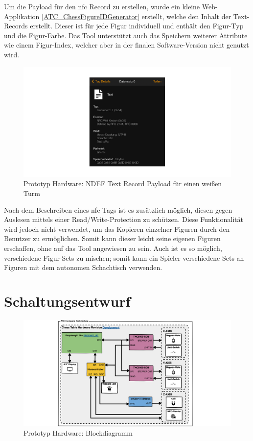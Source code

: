 Um die Payload für den \gls{nfc} Record zu erstellen, wurde ein kleine
Web-Applikation \ref{ATC_ChessFigureIDGenerator} erstellt, welche den
Inhalt der Text-Records erstellt. Dieser ist für jede Figur individuell
und enthält den Figur-Typ und die Figur-Farbe. Das Tool unterstützt auch
das Speichern weiterer Attribute wie einem Figur-Index, welcher aber in
der finalen Software-Version nicht genutzt wird.

\begin{figure}
\centering
\includegraphics{images/ndef_record_rook.png}
\caption{Prototyp Hardware: NDEF Text Record Payload für einen weißen
Turm \label{ndef_record_rook}}
\end{figure}

Nach dem Beschreiben eines \gls{nfc} Tags ist es zusätzlich möglich,
diesen gegen Auslesen mittels einer Read/Write-Protection zu schützen.
Diese Funktionalität wird jedoch nicht verwendet, um das Kopieren
einzelner Figuren durch den Benutzer zu ermöglichen. Somit kann dieser
leicht seine eigenen Figuren erschaffen, ohne auf das Tool angewiesen zu
sein. Auch ist es so möglich, verschiedene Figur-Sets zu mischen; somit
kann ein Spieler verschiedene Sets an Figuren mit dem autonomen
Schachtisch verwenden.

\hypertarget{schaltungsentwurf}{%
\section{Schaltungsentwurf}\label{schaltungsentwurf}}

\begin{figure}
\centering
\includegraphics{images/ATC_Hardware_Architecture_DK.png}
\caption{Prototyp Hardware: Blockdiagramm
\label{ATC_Hardware_Architecture_DK}}
\end{figure}

